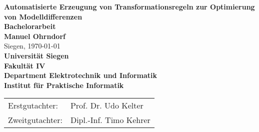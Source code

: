 %
%

\begin{titlepage}
    \begin{center}
    \huge \textbf{\textsf{Automatisierte Erzeugung von Transformationsregeln zur Optimierung von Modelldifferenzen}} \\
    \vspace{2cm}
    \LARGE\textbf{Bachelorarbeit}\\
     \LARGE\textbf{Manuel Ohrndorf}\\
    \vspace{1cm}
    \normalsize
    Siegen, \today \\
    \vspace{2.5cm}
    \large \textbf{Universität Siegen}\\
    \large \textbf{Fakultät IV}\\
    \large \textbf{Department Elektrotechnik und Informatik}\\
    \large \textbf{Institut für Praktische Informatik}\\
    \vspace{6.0cm}
    \end{center}
  \normalsize{
    \centering
    \begin{tabular}{ll}
      \large Erstgutachter: & {Prof. Dr. Udo Kelter} \\
      \large Zweitgutachter: & {Dipl.-Inf. Timo Kehrer} \\
    \end{tabular}\\
  }
\end{titlepage}

%
%
